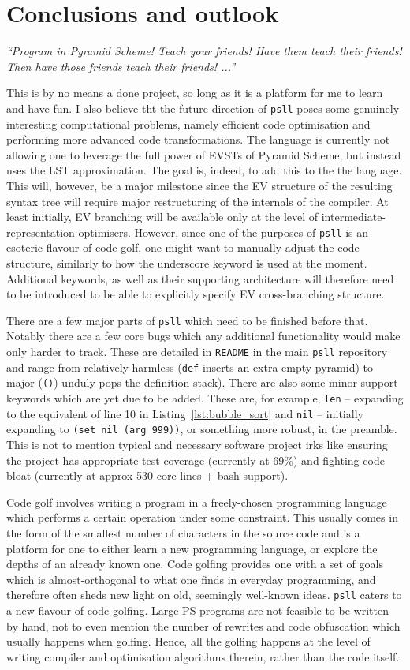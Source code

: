 \documentclass[aip,jcp,reprint,footinbib]{revtex4-1}
\let\tt\texttt
\newcommand\psll{\texttt{psll}\xspace}
\newcommand{\ilpsll}[1]{\lstinline[language=psll,columns=flexible]{#1}}
\begin{document}
\section{Conclusions and outlook}
\textit{\enquote{Program in Pyramid Scheme! Teach your friends! Have them teach \emph{their} friends! Then have those friends teach \emph{their} friends! ...}}

This is by no means a done project, so long as it is a platform for me to learn and have fun. I also believe tht the future direction of \psll poses some genuinely interesting computational problems, namely efficient code optimisation and performing more advanced code transformations. The language is currently not allowing one to leverage the full power of EVSTs of Pyramid Scheme, but instead uses the LST approximation. The goal is, indeed, to add this to the the language. This will, however, be a major milestone since the EV structure of the resulting syntax tree will require major restructuring of the internals of the compiler. At least initially, EV branching will be available only at the level of intermediate-representation optimisers. However, since one of the purposes of \psll is an esoteric flavour of code-golf, one might want to manually adjust the code structure, similarly to how the underscore keyword is used at the moment. Additional keywords, as well as their supporting architecture will therefore need to be introduced to be able to explicitly specify EV cross-branching structure.

There are a few major parts of \psll which need to be finished before that. Notably there are a few core bugs which any additional functionality would make only harder to track. These are detailed in \tt{README} in the main \psll repository and range from relatively harmless (\tt{def} inserts an extra empty pyramid) to major (\tt{()}) unduly pops the definition stack). There are also some minor support keywords which are yet due to be added. These are, for example, \tt{len} -- expanding to the equivalent of line 10 in Listing~\ref{lst:bubble_sort} and \tt{nil} -- initially expanding to \ilpsll{(set nil (arg 999))}, or something more robust, in the preamble. This is not to mention typical and necessary software project irks like ensuring the project has appropriate test coverage (currently at 69\%) and fighting code bloat (currently at approx 530 core lines + bash support).

Code golf involves writing a program in a freely-chosen programming language which performs a certain operation under some constraint. This usually comes in the form of the smallest number of characters in the source code and is a platform for one to either learn a new programming language, or explore the depths of an already known one. Code golfing provides one with a set of goals which is almost-orthogonal to what one finds in everyday programming, and therefore often sheds new light on old, seemingly well-known ideas. \psll caters to a new flavour of code-golfing. Large PS programs are not feasible to be written by hand, not to even mention the number of rewrites and code obfuscation which usually happens when golfing. Hence, all the golfing happens at the level of writing compiler and optimisation algorithms therein, rather than the code itself.\cite{psnegation_answer}
\end{document}
